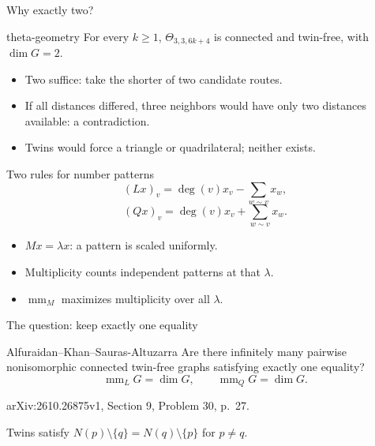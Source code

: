 \documentclass{beamer}
\begin{document}
\begin{frame}{Why exactly two?}
\begin{bookresult}{theta-geometry}
For every $k\geq1$, $\Theta_{3,3,6k+4}$ is connected and twin-free, with $\dim G=2$.
\end{bookresult}
\begin{itemize}
\item Two suffice: take the shorter of two candidate routes.
\item If all distances differed, three neighbors would have only two distances available: a contradiction.
\item Twins would force a triangle or quadrilateral; neither exists.
\end{itemize}
\end{frame}
\begin{frame}{Two rules for number patterns}
\[
(Lx)_v=\deg(v)x_v-\sum_{w\sim v}x_w,
\]
\[
(Qx)_v=\deg(v)x_v+\sum_{w\sim v}x_w.
\]
\begin{itemize}
\item $Mx=\lambda x$: a pattern is scaled uniformly.
\item Multiplicity counts independent patterns at that $\lambda$.
\item $\operatorname{mm}_M$ maximizes multiplicity over all $\lambda$.
\end{itemize}
\end{frame}
\begin{frame}{The question: keep exactly one equality}
\begin{block}{Alfuraidan--Khan--Sauras-Altuzarra}
Are there infinitely many pairwise nonisomorphic connected twin-free graphs satisfying exactly one equality?
\[
\operatorname{mm}_L G=\dim G,\qquad
\operatorname{mm}_Q G=\dim G.
\]
\end{block}
\small arXiv:2610.26875v1, Section 9, Problem 30, p.~27.

Twins satisfy $N(p)\setminus\{q\}=N(q)\setminus\{p\}$ for $p\ne q$.
\end{frame}
\end{document}
